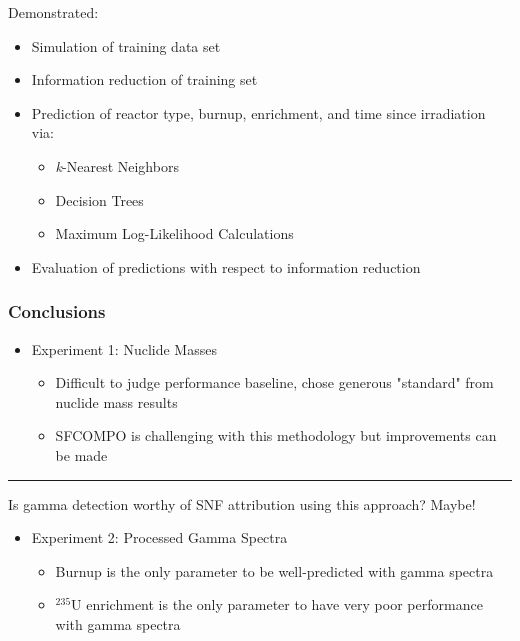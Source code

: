 \begin{frame}
\begin{adjustwidth}{-15pt}{-10pt}
\begin{minipage}{0.65\textwidth}
\begin{block}{Demonstrated:}
      \small
      \begin{itemize}
        \itemsep 0.1em 
        \item Simulation of training data set
        \item Information reduction of training set
        \item Prediction of reactor type, burnup, enrichment, and time since irradiation via:
          \begin{itemize}
            \item \textit{k}-Nearest Neighbors
            \item Decision Trees
            \item Maximum Log-Likelihood Calculations
          \end{itemize}
        \item Evaluation of predictions with respect to information reduction
      \end{itemize}
    \end{block}
  \end{minipage}
  \end{adjustwidth}
\end{frame}

\begin{frame}
  \frametitle{Conclusions}
  \begin{itemize}
    \item Experiment 1: Nuclide Masses
      \begin{itemize}
        \item Difficult to judge performance baseline, chose generous "standard" from nuclide mass results
        \item SFCOMPO is challenging with this methodology but improvements can be made
      \end{itemize}
  \end{itemize}
  \vspace{4mm}
  \hrule
  \begin{center}
    Is gamma detection worthy of SNF attribution using this approach? \Large Maybe!
  \end{center}
  \begin{itemize}
    \item Experiment 2: Processed Gamma Spectra
      \begin{itemize}
        \item Burnup is the only parameter to be well-predicted with gamma spectra
        \item ${}^{235}\text{U}$ enrichment is the only parameter to have very poor performance with gamma spectra
      \end{itemize}
    \end{itemize}
\end{frame}

